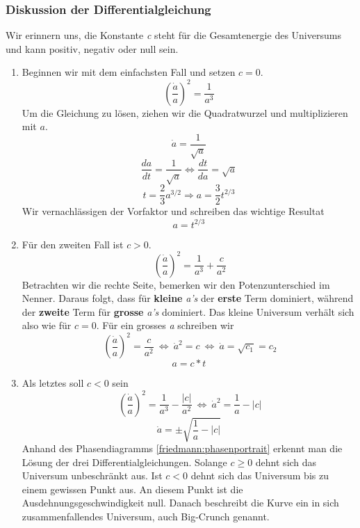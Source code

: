 \begin{refsection}
\subsubsection{Diskussion der Differentialgleichung}
Wir erinnern uns, die Konstante \textit{c} steht für die Gesamtenergie des Universums und kann positiv, negativ oder null sein.
\begin{enumerate}
	\item Beginnen wir mit dem einfachsten Fall und setzen $c = 0$.
	\[\left(\frac{\dot{a}}{a} \right)^2 = \frac{1}{a^3}\]
	Um die Gleichung zu lösen, ziehen wir die Quadratwurzel und multiplizieren mit $a$.
	\[ \dot{a} = \frac{1}{\sqrt{a}} \]
	\[\frac{da}{dt} =\frac{1}{\sqrt{a}} \Leftrightarrow \frac{dt}{da} = \sqrt{a} \]
	\[ t = \frac{2}{3} a^{3/2} \Rightarrow a = \frac{3}{2} t^{2/3} \]
	Wir vernachlässigen der Vorfaktor und schreiben das wichtige Resultat
	\begin{equation}
	a = t^{2/3}
	\end{equation}
	
	\item Für den zweiten Fall ist $c > 0$.
	\[\ \left(\frac{\dot{a}}{a} \right)^2 = \frac{1}{a^3} + \frac{c}{a^2}\]
	Betrachten wir die rechte Seite, bemerken wir den Potenzunterschied im Nenner. Daraus folgt, dass für \textbf{kleine} \textit{a's} der \textbf{erste} Term dominiert, während der \textbf{zweite} Term für \textbf{grosse} \textit{a's} dominiert. Das kleine Universum verhält sich also wie für $c = 0$. Für ein grosses \textit{a} schreiben wir
	\[\ \left(\frac{\dot{a}}{a} \right)^2 = \frac{c}{a^2} \: \Leftrightarrow \:	\dot{a}^2 = c \: \Leftrightarrow \: \dot{a} = \sqrt{c_1} = c_2\]
	\begin{equation}
	a = c*t
	\end{equation}
	
	\item Als letztes soll $c < 0$ sein
	\[\ \left(\frac{\dot{a}}{a} \right)^2 = \frac{1}{a^3} - \frac{|c|}{a^2} \: \Leftrightarrow \: \dot{a}^2 = \frac{1}{a} - |c|\]
	\begin{equation}
	\dot{a} = \pm \sqrt{\frac{1}{a} - |c|}
	\end{equation}
	Anhand des Phasendiagramms \ref{friedmann:phasenportrait} erkennt man die Lösung der drei Differentialgleichungen. Solange $c \geq 0$ dehnt sich das Universum unbeschränkt aus. Ist $c < 0$ dehnt sich das Universum bis zu einem gewissen Punkt aus. An diesem Punkt ist die Ausdehnungsgeschwindigkeit null. Danach beschreibt die Kurve ein in sich zusammenfallendes Universum, auch Big-Crunch genannt.
	

\end{enumerate}
\end{refsection}
